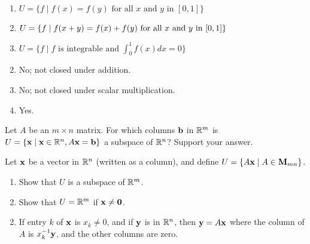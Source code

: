 \begin{multicols}{2}
\begin{ex}
\begin{enumerate}[label={\alph*.}]
\item $U = \{f \mid f(x) = f(y) \mbox{ for all } x \mbox{ and } y \mbox{ in } [0, 1]\}$

\item $U = \{f \mid f(x + y) = f(x) + f(y) \mbox{ for all } \\ x \mbox{ and } y \mbox{ in } [0, 1]\}$

\item $U = \{f \mid f \mbox{ is integrable and } \int_{0}^{1} f(x)dx = 0\}$
\end{enumerate}
\begin{sol}
\begin{enumerate}[label={\alph*.}]
\setcounter{enumi}{1}
\item  No; not closed under addition.

\setcounter{enumi}{3}
\item  No; not closed under scalar multiplication.

\setcounter{enumi}{5}
\item  Yes.

\end{enumerate}
\end{sol}
\end{ex}

\begin{ex}
Let $A$ be an $m \times n$ matrix. For which columns $\textbf{b}$ in $\mathbb{R}^m$ is $U = \{\textbf{x} \mid \textbf{x} \in \mathbb{R}^n, A\textbf{x} = \textbf{b}\}$ a subspace of $\mathbb{R}^n$? Support your answer.
\end{ex}

\begin{ex}
Let $\textbf{x}$ be a vector in $\mathbb{R}^n$ (written as a column), and define $U = \{A\textbf{x} \mid A \in \textbf{M}_{mn}\}$.

\begin{enumerate}[label={\alph*.}]
\item Show that $U$ is a subspace of $\mathbb{R}^m$.

\item Show that $U = \mathbb{R}^m$ if $\textbf{x} \neq \textbf{0}$.

\end{enumerate}
\begin{sol}
\begin{enumerate}[label={\alph*.}]
\setcounter{enumi}{1}
\item  If entry $k$ of $\textbf{x}$ is $x_{k} \neq 0$, and if $\textbf{y}$ is in $\mathbb{R}^n$, then $\textbf{y} = A\textbf{x}$ where the column of $A$ is $x_{k}^{-1}\textbf{y}$, and the other columns are zero.


\end{enumerate}
\end{sol}
\end{ex}
\end{multicols}
